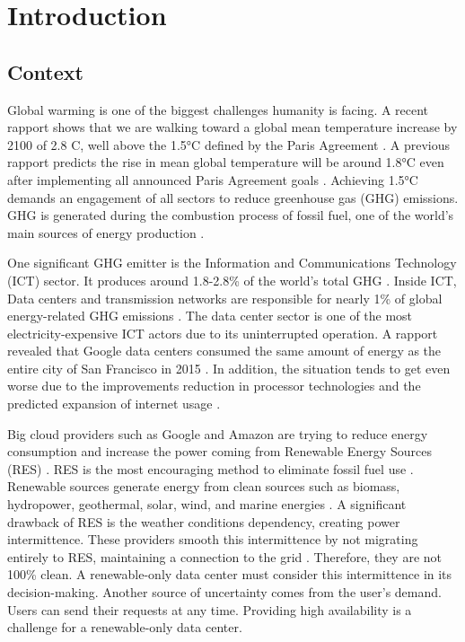 \chapter{Introduction}
\label{cha:introduction}

\section{Context}

Global warming is one of the biggest challenges humanity is facing. A recent rapport shows that we are walking toward a global mean temperature increase by 2100 of 2.8 \degree C, well above the 1.5°C defined by the Paris Agreement \cite{lee2023ar6}. A previous rapport predicts the rise in mean global temperature will be around 1.8°C even after implementing all announced Paris Agreement goals \cite{tracker2022projections}. Achieving 1.5°C demands an engagement of all sectors to reduce greenhouse gas (GHG) emissions. GHG is generated during the combustion process of fossil fuel, one of the world's main sources of energy production \cite{olabi2022renewable}.

One significant GHG emitter is the Information and Communications Technology (ICT) sector. It produces around 1.8-2.8\% of the world's total GHG \cite{freitag2021climate}. Inside ICT, Data centers and transmission networks are responsible for nearly 1\% of global energy-related GHG emissions \cite{centres2022data}. The data center sector is one of the most electricity-expensive ICT actors due to its uninterrupted operation. A rapport revealed that Google data centers consumed the same amount of energy as the entire city of San Francisco in 2015 \cite{khan2018exploiting}. In addition, the situation tends to get even worse due to the improvements reduction in processor technologies and the predicted expansion of internet usage \cite{cisco2020cisco, freitag2021climate}.

Big cloud providers such as Google and Amazon are trying to reduce energy consumption and increase the power coming from Renewable Energy Sources (RES) \cite{Masanet984}. RES is the most encouraging method to eliminate fossil
fuel use \cite{olabi2022renewable}. Renewable sources generate energy from clean sources such as biomass, hydropower, geothermal, solar, wind, and marine energies \cite{augustine2012renewable, panwar2011role, rostirolla2022survey, UNREnewable, gross2003progress}. A significant drawback of RES is the weather conditions dependency, creating power intermittence. These providers smooth this intermittence by not migrating entirely to RES, maintaining a connection to the grid \cite{rostirolla2022survey}. Therefore, they are not 100\% clean. A renewable-only data center must consider this intermittence in its decision-making. Another source of uncertainty comes from the user's demand. Users can send their requests at any time. Providing high availability is a challenge for a renewable-only data center.

